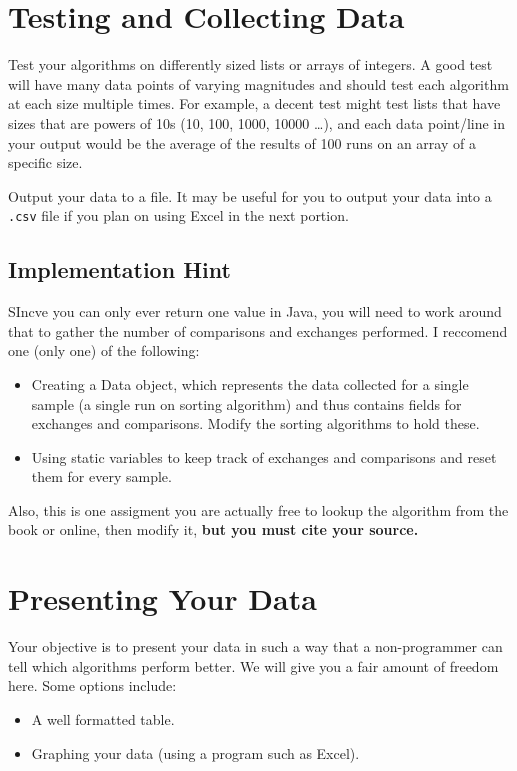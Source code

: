 \documentclass[10pt,letterpaper]{article}
\begin{document}
	\section{Testing and Collecting Data}
	Test your algorithms on differently sized lists or arrays of integers.
	A good test will have many data points of varying magnitudes and should test each algorithm at each size multiple times.  
	For example, a decent test might test lists that have sizes that are powers of 10s (10, 100, 1000, 10000 \dots), and each data point/line in your output would be the average of the results of 100 runs on an array of a specific size. 
	
	
	Output your data to a file.
	It may be useful for you to output your data into a \texttt{.csv} file if you plan on using Excel in the next portion.
	\subsection{Implementation Hint}
	SIncve you can only ever return one value in Java, you will need to work around that to gather the number of comparisons and exchanges performed.
	I reccomend one (only one) of the following:
	\begin{itemize}
		\item Creating a Data object, which represents the data collected for a single sample (a single run on sorting algorithm) and thus contains fields for exchanges and comparisons.  Modify the sorting algorithms to hold these.
		\item Using static variables to keep track of exchanges and comparisons and reset them for every sample.
	\end{itemize}

	Also, this is one assigment you are actually free to lookup the algorithm from the book or online, then modify it, \textbf{but you must cite your source.}
	
	\section{Presenting Your Data}
	
	Your objective is to present your data in such a way that a non-programmer can tell which algorithms perform better.
	We will give you a fair amount of freedom here.
	Some options include:
	\begin{itemize}
		\item A well formatted table.
		\item Graphing your data (using a program such as Excel).
	\end{itemize}
	
\end{document}
